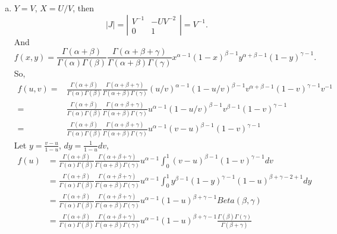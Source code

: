 \documentclass[14pt]{elegantbook}
\begin{document}
    \begin{solution}
        \begin{enumerate}[(a)]
            \item $Y=V$, $X=U/V$, then
            \[|J|=\left|\begin{matrix}
                V^{-1}&-UV^{-2}\\
                0&1
            \end{matrix}\right|=V^{-1}. \]
            And 
            \[f(x,y)=\frac{\Gamma(\alpha+\beta)}{\Gamma(\alpha)\Gamma(\beta)}\frac{\Gamma(\alpha+\beta+\gamma)}{\Gamma(\alpha+\beta)\Gamma(\gamma)}x^{\alpha-1}(1-x)^{\beta-1}y^{\alpha+\beta-1}(1-y)^{\gamma-1}. \]
            So, 
            \begin{align*}
                f(u, v)=&\frac{\Gamma(\alpha+\beta)}{\Gamma(\alpha)\Gamma(\beta)}\frac{\Gamma(\alpha+\beta+\gamma)}{\Gamma(\alpha+\beta)\Gamma(\gamma)}(u/v)^{\alpha-1}(1-u/v)^{\beta-1}v^{\alpha+\beta-1}(1-v)^{\gamma-1}v^{-1}\\
                =&\frac{\Gamma(\alpha+\beta)}{\Gamma(\alpha)\Gamma(\beta)}\frac{\Gamma(\alpha+\beta+\gamma)}{\Gamma(\alpha+\beta)\Gamma(\gamma)}u^{\alpha-1}(1-u/v)^{\beta-1}v^{\beta-1}(1-v)^{\gamma-1}\\
                =&\frac{\Gamma(\alpha+\beta)}{\Gamma(\alpha)\Gamma(\beta)}\frac{\Gamma(\alpha+\beta+\gamma)}{\Gamma(\alpha+\beta)\Gamma(\gamma)}u^{\alpha-1}(v-u)^{\beta-1}(1-v)^{\gamma-1}
            \end{align*}
            Let $y=\frac{v-u}{1-u}$, $dy=\frac{1}{1-u}dv$, 
            \begin{align*}
                f(u)&=\frac{\Gamma(\alpha+\beta)}{\Gamma(\alpha)\Gamma(\beta)}\frac{\Gamma(\alpha+\beta+\gamma)}{\Gamma(\alpha+\beta)\Gamma(\gamma)}u^{\alpha-1}\int_0^1(v-u)^{\beta-1}(1-v)^{\gamma-1}dv\\
                &=\frac{\Gamma(\alpha+\beta)}{\Gamma(\alpha)\Gamma(\beta)}\frac{\Gamma(\alpha+\beta+\gamma)}{\Gamma(\alpha+\beta)\Gamma(\gamma)}u^{\alpha-1}\int_0^1y^{\beta-1}(1-y)^{\gamma-1}(1-u)^{\beta+\gamma-2+1}dy\\
                &=\frac{\Gamma(\alpha+\beta)}{\Gamma(\alpha)\Gamma(\beta)}\frac{\Gamma(\alpha+\beta+\gamma)}{\Gamma(\alpha+\beta)\Gamma(\gamma)}u^{\alpha-1}(1-u)^{\beta+\gamma-1} Beta(\beta, \gamma)\\
                &=\frac{\Gamma(\alpha+\beta)}{\Gamma(\alpha)\Gamma(\beta)}\frac{\Gamma(\alpha+\beta+\gamma)}{\Gamma(\alpha+\beta)\Gamma(\gamma)}u^{\alpha-1}(1-u)^{\beta+\gamma-1} \frac{\Gamma(\beta)\Gamma(\gamma)}{\Gamma(\beta+\gamma)}\\

\end{align*}
\end{enumerate}
\end{solution}
\end{document}
